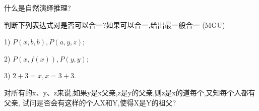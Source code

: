 \begin{think}
  什么是自然演绎推理?
\end{think}

\begin{think}
判断下列表达式对是否可以合一?如果可以合一,给出最一般合一 (MGU)

1) $P(x,b,b), P(a, y, z)$;

2) $P(x,f(x)),P(y,y)$;

3) $2+3=x,x=3+3$.
\end{think}

\begin{think}
  对所有的x、y、z来说,如果y是x父亲,z是y的父亲,则z是x的道每个,又知每个人都有父亲, 试问是否会有这样的个人X和Y,使得X是Y的祖父?
\end{think}
